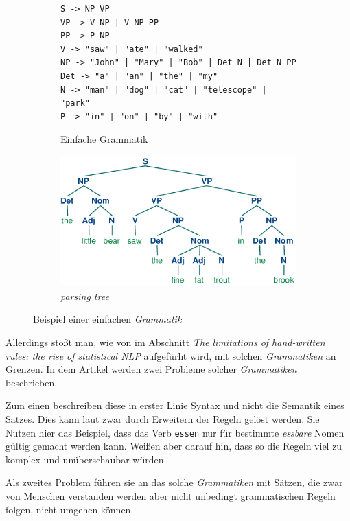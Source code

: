     \begin{figure}[H]
		\centering
        \begin{subfigure}{0.49\textwidth}
			\begin{lstlisting}
S -> NP VP
VP -> V NP | V NP PP
PP -> P NP
V -> "saw" | "ate" | "walked"
NP -> "John" | "Mary" | "Bob" | Det N | Det N PP
Det -> "a" | "an" | "the" | "my"
N -> "man" | "dog" | "cat" | "telescope" | "park"
P -> "in" | "on" | "by" | "with"
    		\end{lstlisting}
            \caption{Einfache Grammatik}
            \label{fig:grammer}
		\end{subfigure}
        \begin{subfigure}{0.49\textwidth}
           	\centering
          	\includegraphics[width=.8\linewidth]{images/grammer.png}
           	\caption{\emph{parsing tree}}
           	\label{fig:parsingTree}
        \end{subfigure}
        \label{fig:grammerWithTree}
        \caption{Beispiel einer einfachen \emph{Grammatik} \parencite[Kapitel 8]{nltk:book}}
        \end{figure}
        \newpage
        
        Allerdings stößt man, wie von \cite[S. 544]{jamia:introduction} im Abschnitt \emph{The limitations of hand-written rules: the rise of statistical NLP} aufgefürht wird, mit solchen \emph{Grammatiken} an Grenzen. In dem Artikel werden zwei Probleme solcher \emph{Grammatiken} beschrieben.
    
    	Zum einen beschreiben diese in erster Linie Syntax und nicht die Semantik eines Satzes. Dies kann laut \cite{jamia:introduction} zwar durch Erweitern der Regeln gelöst werden. Sie Nutzen hier das Beispiel, dass das Verb \texttt{essen} nur für bestimmte \emph{essbare} Nomen gültig gemacht werden kann. Weißen aber darauf hin, dass so die Regeln viel zu komplex und unüberschaubar würden.
        
        Als zweites Problem führen sie an das solche \emph{Grammatiken} mit Sätzen, die zwar von Menschen verstanden werden aber nicht unbedingt grammatischen Regeln folgen, nicht umgehen können.
        
